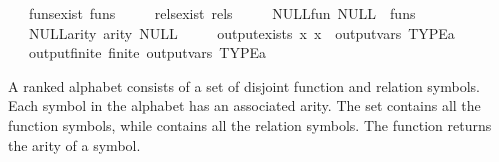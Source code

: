 \begin{isabellebody}
\ \ \ funs{}exist{}\ {}funs\ {}\ {}{}{}\isanewline
\ \ \ rels{}exist{}\ {}rels\ {}\ {}{}{}\isanewline
\ \ \ NULL{}fun{}\ {}NULL\ {}\ funs{}\isanewline
\ \ \ NULL{}arity{}\ {}arity\ NULL\ {}\ {}{}\isanewline
\ \ \ output{}exists{}\ {}{}x{}\ x\ {}\ output{}vars\ TYPE{}{}a{}{}\isanewline
\ \ \ output{}finite{}\ {}finite\ {}output{}vars\ TYPE{}{}a{}{}{}%
\begin{isamarkuptext}%
A ranked alphabet consists of a set of disjoint function and
relation symbols. Each symbol in the alphabet has an associated
arity. The set  contains all the function symbols, while
 contains all the relation symbols. The 
function returns the arity of a symbol.


\end{isamarkuptext}
\end{isabellebody}
